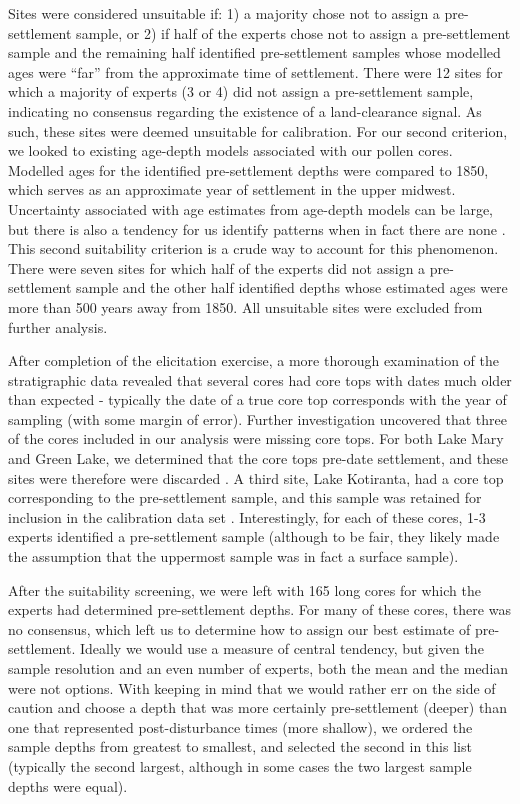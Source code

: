 \documentclass[12pt]{article}
\begin{document}
Sites were considered unsuitable if: 1) a majority chose not to assign
a pre-settlement sample, or 2) if half of the experts chose not to
assign a pre-settlement sample and the remaining half identified
pre-settlement samples whose modelled ages were ``far'' from the
approximate time of settlement. There were 12 sites for which a
majority of experts (3 or 4) did not assign a pre-settlement sample,
indicating no consensus regarding the existence of a land-clearance
signal. As such, these sites were deemed unsuitable for
calibration. For our second criterion, we looked to existing age-depth
models associated with our pollen cores. Modelled ages for the
identified pre-settlement depths were compared to 1850, which serves
as an approximate year of settlement in the upper midwest. Uncertainty
associated with age estimates from age-depth models can be large, but
there is also a tendency for us identify patterns when in fact there
are none \citep{XXX}. This second suitability criterion is a crude way
to account for this phenomenon.  There were seven sites for which half
of the experts did not assign a pre-settlement sample and the other
half identified depths whose estimated ages were more than 500 years
away from 1850. All unsuitable sites were excluded from further
analysis.

After completion of the elicitation exercise, a more thorough
examination of the stratigraphic data revealed that several cores had
core tops with dates much older than expected - typically the date of
a true core top corresponds with the year of sampling (with some
margin of error). Further investigation uncovered that three of the
cores included in our analysis were missing core tops. For both Lake
Mary and Green Lake, we determined that the core tops pre-date
settlement, and these sites were therefore were discarded
\citep{lawrenz1979, XXX}. A third site, Lake Kotiranta, had a core top
corresponding to the pre-settlement sample, and this sample was
retained for inclusion in the calibration data set
\citep{wright1969}. Interestingly, for each of these cores, 1-3
experts identified a pre-settlement sample (although to be fair, they
likely made the assumption that the uppermost sample was in fact a
surface sample).

After the suitability screening, we were left with 165 long cores for
which the experts had determined pre-settlement depths. For many of
these cores, there was no consensus, which left us to determine how to
assign our best estimate of pre-settlement. Ideally we would use a
measure of central tendency, but given the sample resolution and an
even number of experts, both the mean and the median were not
options. With keeping in mind that we would rather err on the side of
caution and choose a depth that was more certainly pre-settlement
(deeper) than one that represented post-disturbance times (more
shallow), we ordered the sample depths from greatest to smallest, and
selected the second in this list (typically the second largest,
although in some cases the two largest sample depths were equal).
\end{document}
